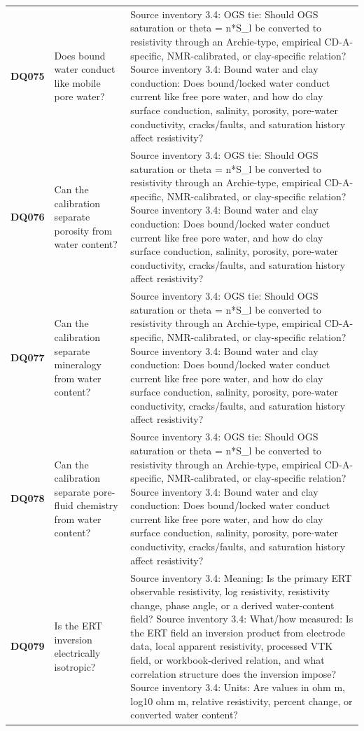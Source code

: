 \begin{longtable}{@{}L{0.09\textwidth} L{0.31\textwidth} L{0.52\textwidth}@{}}
\addlinespace[0.18em]
\textbf{DQ075} & Does bound water conduct like mobile pore water? & Source inventory 3.4: OGS tie: Should OGS saturation or theta = n*S\_l be converted to resistivity through an Archie-type, empirical CD-A-specific, NMR-calibrated, or clay-specific relation? Source inventory 3.4: Bound water and clay conduction: Does bound/locked water conduct current like free pore water, and how do clay surface conduction, salinity, porosity, pore-water conductivity, cracks/faults, and saturation history affect resistivity?\\
\addlinespace[0.18em]
\textbf{DQ076} & Can the calibration separate porosity from water content? & Source inventory 3.4: OGS tie: Should OGS saturation or theta = n*S\_l be converted to resistivity through an Archie-type, empirical CD-A-specific, NMR-calibrated, or clay-specific relation? Source inventory 3.4: Bound water and clay conduction: Does bound/locked water conduct current like free pore water, and how do clay surface conduction, salinity, porosity, pore-water conductivity, cracks/faults, and saturation history affect resistivity?\\
\addlinespace[0.18em]
\textbf{DQ077} & Can the calibration separate mineralogy from water content? & Source inventory 3.4: OGS tie: Should OGS saturation or theta = n*S\_l be converted to resistivity through an Archie-type, empirical CD-A-specific, NMR-calibrated, or clay-specific relation? Source inventory 3.4: Bound water and clay conduction: Does bound/locked water conduct current like free pore water, and how do clay surface conduction, salinity, porosity, pore-water conductivity, cracks/faults, and saturation history affect resistivity?\\
\addlinespace[0.18em]
\textbf{DQ078} & Can the calibration separate pore-fluid chemistry from water content? & Source inventory 3.4: OGS tie: Should OGS saturation or theta = n*S\_l be converted to resistivity through an Archie-type, empirical CD-A-specific, NMR-calibrated, or clay-specific relation? Source inventory 3.4: Bound water and clay conduction: Does bound/locked water conduct current like free pore water, and how do clay surface conduction, salinity, porosity, pore-water conductivity, cracks/faults, and saturation history affect resistivity?\\
\addlinespace[0.18em]
\textbf{DQ079} & Is the ERT inversion electrically isotropic? & Source inventory 3.4: Meaning: Is the primary ERT observable resistivity, log resistivity, resistivity change, phase angle, or a derived water-content field? Source inventory 3.4: What/how measured: Is the ERT field an inversion product from electrode data, local apparent resistivity, processed VTK field, or workbook-derived relation, and what correlation structure does the inversion impose? Source inventory 3.4: Units: Are values in ohm m, log10 ohm m, relative resistivity, percent change, or converted water content?\\

\end{longtable}
